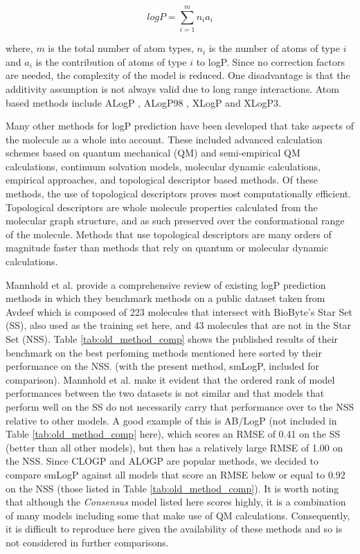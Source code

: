 \documentclass[10pt]{bmc_article}
\newenvironment{bmcformat}{\begin{raggedright}\baselineskip20pt\sloppy\setboolean{publ}{false}}{\end{raggedright}\baselineskip20pt\sloppy}
\begin{document}
\begin{bmcformat}
\begin{equation}
  \label{eq:logP_atom}
  logP = \sum_{i=1}^m n_i a_i
\end{equation}

where, $m$ is the total number of atom types, $n_i$ is the number of atoms of type $i$ and $a_i$ is the contribution of atoms of type $i$ to logP. Since no correction factors are needed, the complexity of the model is reduced. One disadvantage is that the additivity assumption is not always valid due to long range interactions\cite{buchwald_octanol-water_1998}. Atom based methods include ALogP \cite{viswanadhan_atomic_1989}, ALogP98 \cite{wildman_prediction_1999}, XLogP \cite{wang_new_1997} and XLogP3\cite{cheng_computation_2007}.

Many other methods for logP prediction have been developed that take aspects of the molecule as a whole into account\cite{buchwald_octanol-water_1998}. These included advanced calculation schemes based on quantum mechanical (QM) and semi-empirical QM calculations, continuum solvation models, molecular dynamic calculations, empirical approaches, and topological descriptor based methods\cite{mannhold_calculation_2009}. Of these methods, the use of topological descriptors proves most computationally efficient. Topological descriptors are whole molecule properties calculated from the molecular graph structure, and as such preserved over the conformational range of the molecule. Methods that use topological descriptors are many orders of magnitude faster than methods that rely on quantum or molecular dynamic calculations.

Mannhold et al. \cite{mannhold_calculation_2009} provide a comprehensive review of existing logP prediction methods in which they benchmark methods on a public dataset taken from Avdeef \cite{avdeef_absorption_2012} which is composed of 223 molecules that intersect with BioByte's Star Set (SS), also used as the training set here, and 43 molecules that are not in the Star Set (NSS). Table \ref{tab:old_method_comp} shows the published results of their benchmark on the best perfoming methods mentioned here sorted by their performance on the NSS. (with the present method, smLogP, included for comparison). Mannhold et al. \cite{mannhold_calculation_2009} make it evident that the ordered rank of model performances between the two datasets is not similar and that models that perform well on the SS do not necessarily carry that performance over to the NSS relative to other models. A good example of this is AB/LogP (not included in Table \ref{tab:old_method_comp} here), which scores an RMSE of 0.41 on the SS (better than all other models), but then has a relatively large RMSE of 1.00 on the NSS. Since CLOGP and ALOGP are popular methods, we decided to compare smLogP against all models that score an RMSE below or equal to 0.92 on the NSS (those listed in Table \ref{tab:old_method_comp}). It is worth noting that although the \textit{Consensus} model listed here scores highly, it is a combination of many models including some that make use of QM calculations. Consequently, it is difficult to reproduce here given the availability of these methods and so is not considered in further comparisons.


\end{bmcformat}
\end{document}

